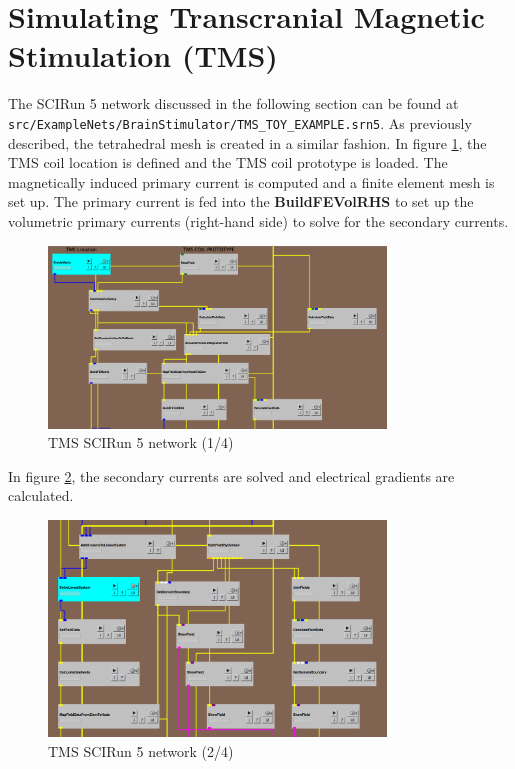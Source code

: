 \documentclass[fleqn,11pt,openany]{book}
\begin{document}
\section{Simulating Transcranial Magnetic Stimulation (TMS)}\label{sec:sim_tms}
The SCIRun 5 network discussed in the following section can be found at \\ \texttt{src/ExampleNets/BrainStimulator/TMS\_TOY\_EXAMPLE.srn5}.
As previously described, the tetrahedral mesh is created in a similar fashion.
In figure \ref{fig:tms1}, the TMS coil location is defined and the TMS coil prototype is loaded. The magnetically induced primary current
is computed and a finite element mesh is set up. The primary current is fed into the \textbf{BuildFEVolRHS} to set up the volumetric primary currents (right-hand side)
to solve for the secondary currents.

 \begin{figure}[!h]
\centering
\includegraphics[width=0.8\textwidth]{BrainStimulation_figures/tms1.png}
\caption{ TMS SCIRun 5 network (1/4)}
\label{fig:tms1}
\end{figure}

In figure \ref{fig:tms2}, the secondary currents are solved and electrical gradients are calculated.

 \begin{figure}[!h]
\centering
\includegraphics[width=0.8\textwidth]{BrainStimulation_figures/tms2.png}
\caption{ TMS SCIRun 5 network (2/4)}
\label{fig:tms2}
\end{figure}
\end{document}
